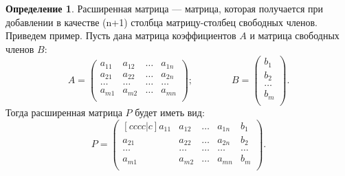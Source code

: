 \documentclass[a5paper, 11pt]{extbook}
\theoremstyle{definition}
\theoremstyle{definition}
\newtheorem{definition}{Определение}[chapter]
\begin{document}
\begin{definition}
    \label{def:augmented-matrix}
    Расширенная матрица — матрица, которая получается при добавлении в качестве (n+1) столбца матрицу-столбец свободных членов. Приведем пример. Пусть дана матрица коэффициентов \(A\) и матрица свободных членов \(B\):
    \begin{equation*}
        A =
        \begin{pmatrix}
            a_{11} & a_{12} & \ldots & a_{1n} \\
            a_{21} & a_{22} & \ldots & a_{2n} \\
            \ldots & \ldots & \ldots & \ldots \\
            a_{m1} & a_{m2} & \ldots & a_{mn} \\
        \end{pmatrix};
        \qquad \qquad
        B =
        \begin{pmatrix}
            b_1    \\
            b_2    \\
            \ldots \\
            b_m    \\
        \end{pmatrix}.
    \end{equation*}
    Тогда расширенная матрица \(P\) будет иметь вид:
    \begin{equation*}
        P =
        \begin{pmatrix}[cccc|c]
            a_{11} & a_{12} & \ldots & a_{1n} & b_1    \\
            a_{21} & a_{22} & \ldots & a_{2n} & b_2    \\
            \ldots & \ldots & \ldots & \ldots & \ldots \\
            a_{m1} & a_{m2} & \ldots & a_{mn} & b_m    \\
        \end{pmatrix}.
    \end{equation*}
\end{definition}
\end{document}
